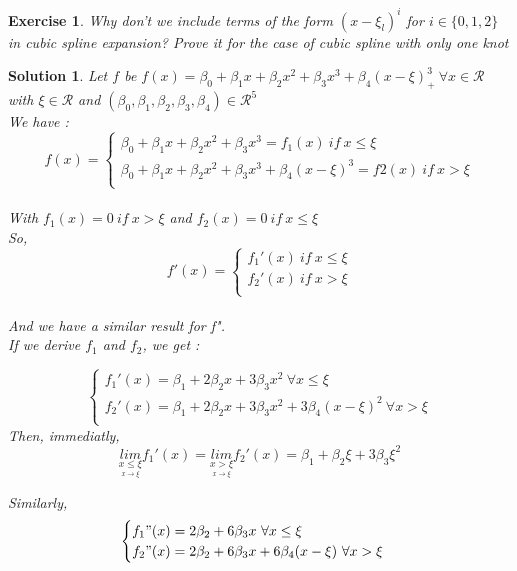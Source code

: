\documentclass[12pt,a4paper]{article}
\def\R{\mathcal{R}}%
\newtheorem{exercise}{Exercise}
\newtheorem{solution}{Solution}
\begin{document}
\begin{exercise}
Why don’t we include terms of the form $(x-\xi_l)^i$ for $i \in \{0,1,2\}$ in cubic spline expansion?
Prove it for the case of cubic spline with only one knot
\end{exercise}
\begin{solution}
Let $f$ be $f(x) = \beta_0 + \beta_1 x + \beta_2 x^2 + \beta_3 x^3 + \beta_4(x - \xi)^3_+ \ \forall x \in \R$ with $\xi \in \R$ and $(\beta_0, \beta_1, \beta_2, \beta_3, \beta_4) \in \R^5$ \\

We have : \[f(x)=\begin{cases}
               \beta_0 + \beta_1 x + \beta_2 x^2 + \beta_3 x^3 = f_1(x) \ if\ x\leq \xi\\
               \beta_0 + \beta_1 x + \beta_2 x^2 + \beta_3 x^3 + \beta_4(x - \xi)^3 = f2(x) \ if\ x > \xi\\
			   \end{cases}\]\\
With $f_1(x) = 0 \ if\ x > \xi$ and $f_2(x) = 0 \ if\ x \leq \xi$\\			   

So, \[f'(x)=\begin{cases}
               f_1'(x) \ if\ x\leq \xi\\
               f_2'(x) \ if\ x > \xi\\
			   \end{cases}\]\\
And we have a similar result for f".\\

If we derive $f_1$ and $f_2$, we get :

\[\begin{cases}
               f_1'(x) = \beta_1 + 2\beta_2x + 3\beta_3x^2 \ \forall x\leq \xi\\
               f_2'(x) = \beta_1 + 2\beta_2x + 3\beta_3x^2 + 3\beta_4(x - \xi)^2 \ \forall x > \xi\\
            \end{cases}\]
Then, immediatly, $$\underset{\underset{x\rightarrow\xi}{x \leq \xi}}{lim}f_1'(x) = \underset{\underset{x\rightarrow\xi}{x > \xi}}{lim}f_2'(x) = \beta_1 + \beta_2\xi + 3\beta_3\xi^2 $$	

Similarly, 
\[\begin{cases}
               f_1"(x) = 2\beta_2 + 6\beta_3x \ \forall x\leq \xi\\
               f_2"(x) = 2\beta_2 + 6\beta_3x + 6\beta_4(x - \xi) \ \forall x > \xi\\
            \end{cases}\]
            

\end{solution}
\end{document}
